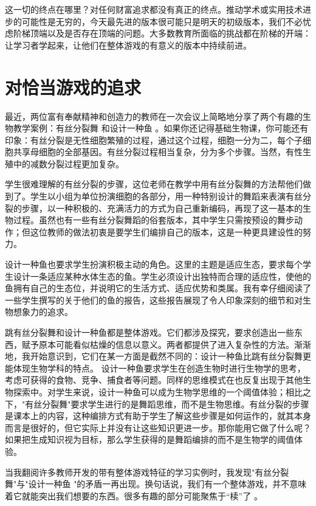 这一切的终点在哪里？对任何财富追求都没有真正的终点。推动学术或实用技术进步的可能性是无穷的，今天最先进的版本很可能只是明天的初级版本，我们不必忧虑阶梯顶端以及是否存在顶端的问题。大多数教育所面临的挑战都在阶梯的开端：让学习者学起来，让他们在整体游戏的有意义的版本中持续前进。

\section*{对恰当游戏的追求}

最近，两位富有奉献精神和创造力的教师在一次会议上简略地分享了两个有趣的生物教学案例：有丝分裂舞 和设计一种鱼 。如果你还记得基础生物课，你可能还有印象：有丝分裂是无性细胞繁殖的过程，通过这个过程，细胞一分为二，每个子细胞共享母细胞的全部基因。有丝分裂过程相当复杂，分为多个步骤。当然，有性生殖中的减数分裂过程更加复杂。

学生很难理解的有丝分裂的步骤，这位老师在教学中用有丝分裂舞的方法帮他们做到了。学生以小组为单位扮演细胞的各部分，用一种特别设计的舞蹈来表演有丝分裂的步骤，以一种积极的、充满活力的方式为自己重新编码，再现了这一基本的生物过程。虽然也有一些有丝分裂舞蹈的俗套版本，其中学生只需按预设的舞步动作；但这位教师的做法初衷是要学生们编排自己的版本，这是一种更具建设性的努力。

设计一种鱼也要求学生扮演积极主动的角色。这里的主题是适应生态，要求每个学生设计一条适应某种水体生态的鱼。学生必须设计出独特而合理的适应性，使他的鱼拥有自己的生态位，并说明它的生活方式、适应优势和类属。我有幸仔细阅读了一些学生撰写的关于他们的鱼的报告，这些报告展现了令人印象深刻的细节和对生物想象力的追求。

跳有丝分裂舞和设计一种鱼都是整体游戏。它们都涉及探究，要求创造出一些东西，赋予原本可能看似枯燥的信息以意义。两者都提供了进入复杂性的方法。渐渐地，我开始意识到，它们在某一方面是截然不同的：设计一种鱼比跳有丝分裂舞更能体现生物学科的特点。
设计一种鱼要求学生在创造生物时进行生物学的思考，考虑可获得的食物、竞争、捕食者等问题。同样的思维模式在也反复出现于其他生物探索中。对学生来说，设计一种鱼可以成为生物学思维的一个阈值体验；相比之下，"有丝分裂舞"要求学生进行的是舞蹈思维，而不是生物思维。有丝分裂的步骤是课本上的内容，这种编排方式有助于学生了解这些步骤是如何运作的，就其本身而言是很好的，但它实际上并没有让这些知识更进一步。那你能用它做了什么呢？如果把生成知识视为目标，那么学生获得的是舞蹈编排的而不是生物学的阈值体验。

当我翻阅许多教师开发的带有整体游戏特征的学习实例时，我发现"有丝分裂舞"与"设计一种鱼 "的矛盾一再出现。换句话说，我们有一个整体游戏，并不意味着它就能突出我们想要的东西。很多有趣的部分可能聚焦于“椟”了 。

